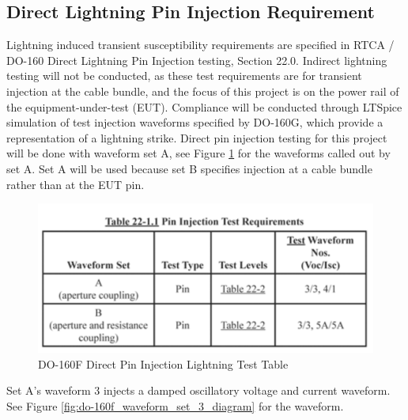 \documentclass[conference]{IEEEtran}
\begin{document}
\subsection{Direct Lightning Pin Injection Requirement}
Lightning induced transient susceptibility requirements are specified in RTCA / DO-160 Direct Lightning Pin Injection testing, Section 22.0. Indirect lightning testing will not be conducted, as these test requirements are for transient injection at the cable bundle, and the focus of this project is on the power rail of the equipment-under-test (EUT). Compliance will be conducted through LTSpice simulation of test injection waveforms specified by DO-160G, which provide a representation of a lightning strike. Direct pin injection testing for this project will be done with waveform set A, see Figure \ref{fig:do-160f_pin_injection_test_table} for the waveforms called out by set A. Set A will be used because set B specifies injection at a cable bundle rather than at the EUT pin. 

\begin{figure}[hp]
    \centering
    \includegraphics[width=1.0\linewidth]{do-160f_pin_injection_test_table.png}
    \caption{DO-160F Direct Pin Injection Lightning Test Table}
    \label{fig:do-160f_pin_injection_test_table}
\end{figure}

Set A's waveform 3 injects a damped oscillatory voltage and current waveform. See Figure \ref{fig:do-160f_waveform_set_3_diagram} for the waveform.
\end{document}
